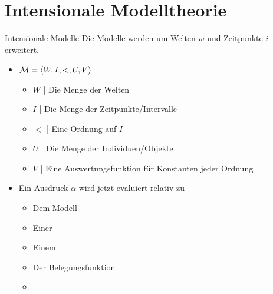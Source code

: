 \section{Intensionale Modelltheorie}

\begin{frame}
  {Intensionale Modelle}
  \onslide<+->
  \onslide<+->
  Die Modelle werden um Welten $w$ und Zeitpunkte $i$ erweitert.\\
  \Halbzeile
  \begin{itemize}[<+->]
    \item \alert{$\mathcal{M}={\langle{}W,I,<,U,V\rangle}$}
      \begin{itemize}[<+->]
        \item \alert{$W$} | Die Menge der Welten
        \item \alert{$I$} | Die Menge der Zeitpunkte\slash Intervalle
        \item \alert{$<$} | Eine Ordnung auf $I$
        \item \alert{$U$} | Die Menge der Individuen\slash Objekte
        \item \alert{$V$} | Eine Auswertungsfunktion für Konstanten jeder Ordnung
      \end{itemize}
      \Halbzeile
    \item Ein Ausdruck $\alpha$ wird jetzt evaluiert relativ zu
      \begin{itemize}[<+->]
        \item Dem Modell \gruen{$\Model$}
        \item Einer  
        \item Einem  
        \item Der Belegungsfunktion 
          \Halbzeile
        \item \gruen{$\DEMM{\alpha}$}
      \end{itemize}
  \end{itemize}
\end{frame}


